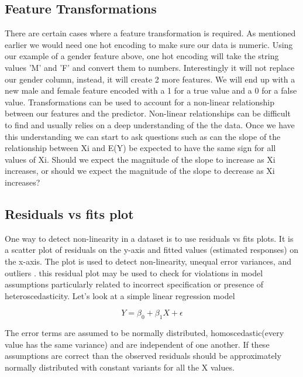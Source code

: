 \subsection{Feature Transformations}

There are certain cases where a feature transformation is required. As mentioned earlier we would need one hot encoding to make sure our data is numeric. Using our example of a gender feature above, one hot encoding will take the string values 'M' and 'F' and convert them to numbers. Interestingly it will not replace our gender column, instead, it will create 2 more features. We will end up with a new male and female feature encoded with a 1 for a true value and a 0 for a false value.
Transformations can be used to account for a non-linear relationship between our features and the predictor. Non-linear relationships can be difficult to find and usually relies on a deep understanding of the the data. Once we have this understanding we can start to ask questions such as can the slope of
the relationship between Xi and E(Y) be expected to have the same sign for all values of Xi. Should we expect the magnitude of the slope to increase as Xi increases, or should we expect
the magnitude of the slope to decrease as Xi increases?\cite{nonlinearRelationships}

\subsection{Residuals vs fits plot}

One way to detect non-linearity in a dataset is to use residuals vs fits plots. It is a scatter plot of residuals on the y-axis and fitted values (estimated responses) on the x-axis. The plot is used to detect non-linearity, unequal error variances, and outliers \cite{residualsVsFitsPlot}. this residual plot may be used to check for violations in model assumptions particularly related to incorrect specification or presence of heteroscedasticity\cite{doi:10.1002/9781118625590.ch2}. Let's look at a simple linear regression model

\[ Y = \beta_0 + \beta_1X + \epsilon \]

The error terms are assumed to be normally distributed, homoscedastic(every value has the same variance) and are independent of one another. If these assumptions are correct than the observed residuals should be approximately normally distributed with constant variants for all the X values.

